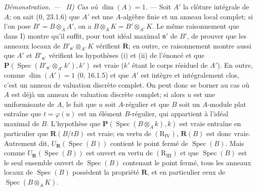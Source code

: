 \documentclass[10pt,oneside]{book}
\newenvironment{proof}{%
  \par\medskip\noindent\textit{Démonstration. ---\ }}{\par}
\begin{document}
\begin{proof}
\emph{II) Cas où $\dim(A)=1$.} --- Soit $A'$ la clôture intégrale de $A$;
on sait (0, 23.1.6) que $A'$ est une $A$-algèbre finie et un anneau local
complet; si l'on pose $B'=B\otimes_A A'$, on a
$B\otimes_A K=B'\otimes_{A'}K$. Le même raisonnement que dans I) montre
qu'il suffit, pour tout idéal maximal $\mathfrak n'$ de $B'$, de prouver que
les anneaux locaux de
$B'_{\mathfrak n'}\otimes_{A'}K$ vérifient $\boldsymbol R$; en outre, ce
raisonnement montre aussi que $A'$ et $B'_{\mathfrak n'}$ vérifient les
hypothèses (i) et (ii) de l'énoncé et que
$\boldsymbol P(\operatorname{Spec}(B'_{\mathfrak n'}\otimes_{A'}k'),k')$
est vraie ($k'$ étant le corps résiduel de $A'$). En outre, comme
$\dim(A')=1$ (0, 16.1.5) et que $A'$ est intègre et intégralement clos,
c'est un anneau de valuation discrète complet. On peut donc se borner au
cas où $A$ est déjà un anneau de valuation discrète complet; si alors $u$
est une uniformisante de $A$, le fait que $u$ soit $A$-régulier et que $B$
soit un $A$-module plat entraîne que $t=\varphi(u)$ est un élément
$B$-régulier, qui appartient à l'idéal maximal de $B$. L'hypothèse que
$\boldsymbol P(\operatorname{Spec}(B\otimes_A k),k)$ est vraie entraîne en
particulier que $\boldsymbol R(B/tB)$ est vraie; en vertu de
$(\mathrm R_{\mathrm{IV}})$, $\boldsymbol R(B)$ est donc vraie. Autrement
dit, $U_{\boldsymbol R}(\operatorname{Spec}(B))$ contient le point fermé de
$\operatorname{Spec}(B)$. Mais comme
$U_{\boldsymbol R}(\operatorname{Spec}(B))$ est ouvert en vertu de
$(\mathrm R_{\mathrm{III}})$ et que $\operatorname{Spec}(B)$ est le seul
ensemble ouvert de $\operatorname{Spec}(B)$ contenant le point fermé, tous
les anneaux locaux de $\operatorname{Spec}(B)$ possèdent la propriété
$\boldsymbol R$, et en particulier ceux de
$\operatorname{Spec}(B\otimes_A K)$.


\end{proof}
\end{document}
